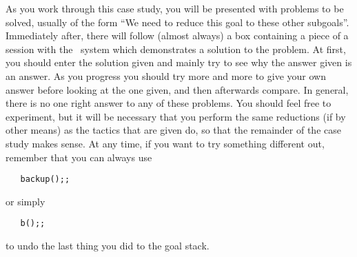 As you work through this case study, you will be presented with
problems to be solved, usually of the form ``We need to reduce this
goal to these other subgoals''.  Immediately after, there will follow
(almost always) a box containing a piece of a session with the \HOL\
system which demonstrates a solution to the problem.  At first, you
should enter the solution given and  mainly try to see why the
answer given is an answer.  As you progress you should try more and
more to give your own answer before looking at the one given, and then
afterwards compare.  In general, there is no one right answer to any
of these problems.  You should feel free to experiment, but it will be
necessary that you perform the same reductions (if by other means) as
the tactics that are given do, so that the remainder of the case study
makes sense.  At any time, if you want to try something different out,
remember that you can always use
\begin{verbatim}
   backup();;
\end{verbatim}
or simply
\begin{verbatim}
   b();;
\end{verbatim}
to undo the last thing you did to the goal stack.

